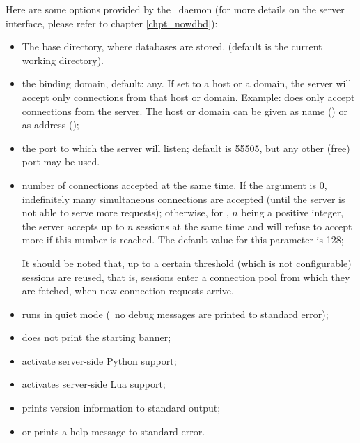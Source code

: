 \begin{minipage}{\textwidth}
Here are some options provided by
the \nowdb\ daemon
(for more details on the server interface,
please refer to chapter \ref{chpt_nowdbd}):

\begin{itemize}
\item {} The base directory,
where databases are stored.
(default is the current working directory).

\item {} the binding domain, default:
any. If set to a host or a domain, the server
will accept only connections from that host
or domain. Example:  does
only accept connections from the server.
The host or domain can be given as name ()
or as  address ();

\item {} the port to which
the server will listen; default is 55505,
but any other (free) port may be used.
 
\item {} number of connections accepted at the same time.
If the argument is 0, indefinitely many
simultaneous connections are accepted
(until the server is not able to serve more requests);
otherwise, for ,
$n$ being a positive integer,
the server accepts
up to $n$ sessions at the same time and
will refuse to accept more if this number is reached.
The default value for this parameter is 128;

It should be noted that, up to a certain threshold
(which is not configurable) sessions are
reused, that is, sessions enter a connection pool
from which they are fetched, when new connection
requests arrive.

\item {} runs in quiet mode
(\ie\ no debug messages are printed to standard error);
\item {} does not print the starting banner;
\item {} activate server-side Python support;
\item {} activates server-side Lua support;
\item {} prints version information to standard output;
\item {} or  prints a help message to standard error.
\end{itemize}
\end{minipage}

